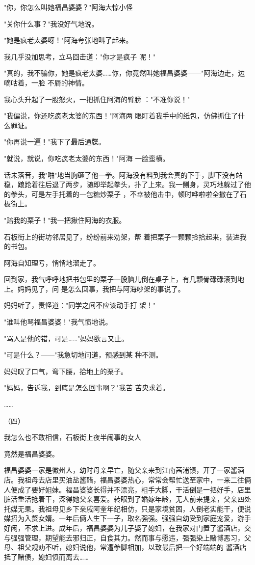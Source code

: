 \documentclass{article}
\begin{document}
"你，你怎么叫她福昌婆婆？"阿海大惊小怪


"关你什么事？"我没好气地说。 

"她是疯老太婆呀！"阿海夸张地叫了起来。

我几乎没加思考，立马回击道："你才是疯子
呢！" 

"真的，我不骗你，她是疯老太婆……你，你竟然叫她福昌婆婆——"阿海边走，边嘀咕着，一脸
不屑的神情。 

我心头升起了一股怒火，一把抓住阿海的臂膀
："不准你说！" 

"我偏说，你还吃疯老太婆的东西！"阿海两
眼盯着我手中的纸包，仿佛抓住了什么罪证。 


\newpage

"你再说一遍！"我下了最后通牒。 

"就说，就说，你吃疯老太婆的东西！"阿海
一脸蛮横。 

话未落音，我"啪"地当胸砸了他一拳。阿海没有料到我会真的下手，脚下没有站稳，踉跄着往后退了两步，随即举起拳头，扑了上来。我一侧身，灵巧地躲过了他的拳头，可是左手托着的一包糖炒栗子
，不幸被他击中，顿时哗啦啦全撒在了石板街上。 


"赔我的栗子！"我一把揪住阿海的衣服。 

石板街上的街坊邻居见了，纷纷前来劝架，帮
着把栗子一颗颗捡拾起来，装进我的书包。 


阿海自知理亏，悄悄地溜走了。 

回到家，我气呼呼地把书包里的栗子一股脑儿倒在桌子上，有几颗骨碌碌滚到地上。妈妈见了，问
是怎么回事，我把与阿海吵架的事说了。 

\newpage

妈妈听了，责怪道："同学之间不应该动手打
架！" 


"谁叫他骂福昌婆婆！"我气愤地说。 

"骂人是他的错，可是……"妈妈欲言又止。

"可是什么？——"我急切地问道，预感到某
种不测。 


妈妈叹了口气，弯下腰，拾地上的栗子。 

"妈妈，告诉我，到底是怎么回事啊？"我苦
苦央求着。 


…… 


（四） 

我怎么也不敢相信，石板街上夜半闹事的女人

\newpage
竟然是福昌婆婆。 

福昌婆婆一家是徽州人，幼时母亲早亡，随父亲来到江南茜浦镇，开了一家酱酒店。我祖母去店里买油盐酱醋，福昌婆婆热心，常常会帮忙送至家中，一来二往俩人便成了要好姐妹。福昌婆婆长得并不漂亮，粗手大脚，干活倒是一把好手，店里脏活重活抢着干，深得她父亲喜爱。转眼到了婚嫁年龄，无人前来提亲，父亲四处托媒无果。我祖母见乡下亲戚阿奎年纪相仿，只是家境贫困，人倒老实能干，便说媒招为入赘女婿。一年后俩人生下一子，取名强强。强强自幼受到家庭宠爱，游手好闲，不求上进。成年后，福昌婆婆为儿子娶了媳妇，在我家对门置了酱酒店，交与强强管理，期望能去邪归正，自食其力。然而事与愿违，强强染上赌博恶习，父母、祖父规劝不听，媳妇说他，常遭拳脚相加，以致最后把一个好端端的
酱酒店抵了赌债，媳妇愤而离去…… 
\end{document}
